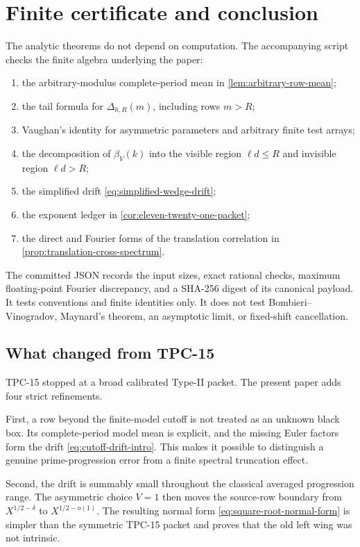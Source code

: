 \section{Finite certificate and conclusion}
\label{sec:computation-conclusion}

The analytic theorems do not depend on computation.  The accompanying
script
 checks the
finite algebra underlying the paper:
\begin{enumerate}[label=\textup{(\roman*)}]
 \item the arbitrary-modulus complete-period mean in
 \cref{lem:arbitrary-row-mean};
 \item the tail formula for $\Delta_{h,R}(m)$, including rows $m>R$;
 \item Vaughan's identity for asymmetric parameters and arbitrary finite
 test arrays;
 \item the decomposition of $\beta_V(k)$ into the visible region
 $\ell d\le R$ and invisible region $\ell d>R$;
 \item the simplified drift \eqref{eq:simplified-wedge-drift};
 \item the exponent ledger in \cref{cor:eleven-twenty-one-packet};
 \item the direct and Fourier forms of the translation correlation in
 \cref{prop:translation-cross-spectrum}.
\end{enumerate}
The committed JSON records the input sizes, exact rational checks, maximum
floating-point Fourier discrepancy, and a SHA-256 digest of its canonical
payload.  It tests conventions and finite identities only.  It does not
test Bombieri--Vinogradov, Maynard's theorem, an asymptotic limit, or
fixed-shift cancellation.

\subsection{What changed from TPC-15}

TPC-15 stopped at a broad calibrated Type-II packet.  The present paper
adds four strict refinements.

First, a row beyond the finite-model cutoff is not treated as an unknown
black box.  Its complete-period model mean is explicit, and the missing
Euler factors form the drift \eqref{eq:cutoff-drift-intro}.  This makes it
possible to distinguish a genuine prime-progression error from a finite
spectral truncation effect.

Second, the drift is summably small throughout the classical averaged
progression range.  The asymmetric choice $V=1$ then moves the source-row
boundary from $X^{1/2-\delta}$ to $X^{1/2-o(1)}$.  The resulting normal
form \eqref{eq:square-root-normal-form} is simpler than the symmetric
TPC-15 packet and proves that the old left wing was not intrinsic.

